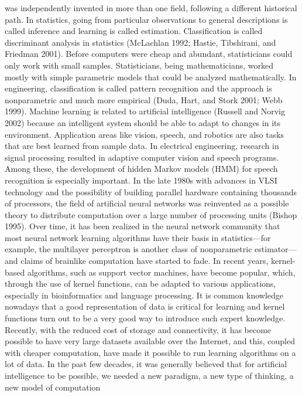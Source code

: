 was independently invented in more than one field, following a different historical path. In statistics, going from particular observations to general descriptions is called inference and learning is called estimation. Classification is called discriminant analysis in statistics (McLachlan 1992; Hastie, Tibshirani, and Friedman 2001). Before computers were cheap and abundant, statisticians could only work with small samples. Statisticians, being mathematicians, worked mostly with simple parametric models that could be analyzed mathematically. In engineering, classification is called pattern recognition and the approach is nonparametric and much more empirical (Duda, Hart, and Stork 2001; Webb 1999). Machine learning is related to artificial intelligence (Russell and Norvig 2002) because an intelligent system should be able to adapt to changes in its environment. Application areas like vision, speech, and robotics are also tasks that are best learned from sample data. In electrical engineering, research in signal processing resulted in adaptive computer vision and speech programs. Among these, the development of hidden Markov models (HMM) for speech recognition is especially important. In the late 1980s with advances in VLSI technology and the possibility of building parallel hardware containing thousands of processors, the field of artificial neural networks was reinvented as a possible theory to distribute computation over a large number of processing units (Bishop 1995). Over time, it has been realized in the neural network community that most neural network learning algorithms have their basis in statistics---for example, the multilayer perceptron is another class of nonparametric estimator---and claims of brainlike computation have started to fade. In recent years, kernel-based algorithms, such as support vector machines, have become popular, which, through the use of kernel functions, can be adapted to various applications, especially in bioinformatics and language processing. It is common knowledge nowadays that a good representation of data is critical for learning and kernel functions turn out to be a very good way to introduce such expert knowledge. Recently, with the reduced cost of storage and connectivity, it has become possible to have very large datasets available over the Internet, and this, coupled with cheaper computation, have made it possible to run learning algorithms on a lot of data. In the past few decades, it was generally believed that for artificial intelligence to be possible, we needed a new paradigm, a new type of thinking, a new model of computation

